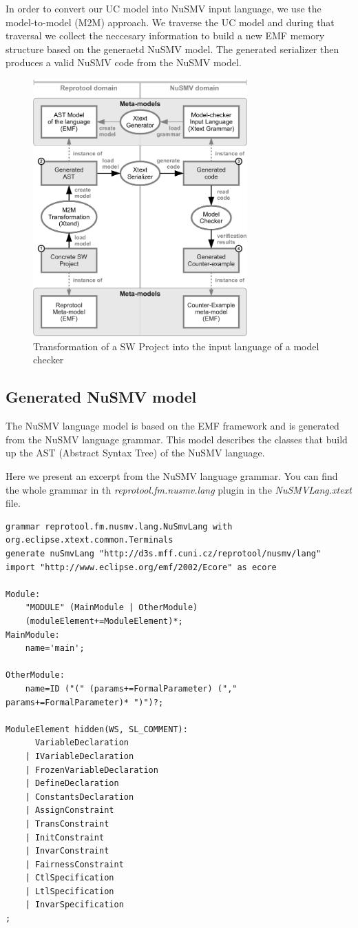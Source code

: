 In order to convert our UC model into NuSMV input language, we use the model-to-model (M2M) approach.
We traverse the UC model and during that traversal we collect the neccesary information to build a new EMF memory structure based on the generaetd NuSMV model.
The generated serializer then produces a valid NuSMV code from the NuSMV model.

\begin{figure}[ht]
  \centering
  \includegraphics[height=280pt]{images/XtextWorkflow}
  \caption{Transformation of a SW Project into the input language of a model checker}
  \label{fig:XtextWorkflow}
\end{figure}
\pagebreak

\subsection{Generated NuSMV model}

The NuSMV language model is based on the EMF framework and is generated from the NuSMV language grammar.
This model describes the classes that build up the AST (Abstract Syntax Tree) of the NuSMV language.

Here we present an excerpt from the NuSMV language grammar. You can find the whole grammar in th
\emph{reprotool.fm.nusmv.lang} plugin in the \emph{NuSMVLang.xtext} file.

\begin{lstlisting}[language=XtextGrammar]
grammar reprotool.fm.nusmv.lang.NuSmvLang with org.eclipse.xtext.common.Terminals
generate nuSmvLang "http://d3s.mff.cuni.cz/reprotool/nusmv/lang"
import "http://www.eclipse.org/emf/2002/Ecore" as ecore

Module:
	"MODULE" (MainModule | OtherModule)
	(moduleElement+=ModuleElement)*;
MainModule:
	name='main';

OtherModule:
	name=ID ("(" (params+=FormalParameter) ("," params+=FormalParameter)* ")")?;

ModuleElement hidden(WS, SL_COMMENT):
	  VariableDeclaration
	| IVariableDeclaration
	| FrozenVariableDeclaration
	| DefineDeclaration
	| ConstantsDeclaration
	| AssignConstraint
	| TransConstraint
	| InitConstraint
	| InvarConstraint
	| FairnessConstraint
	| CtlSpecification
	| LtlSpecification
	| InvarSpecification
;
\end{lstlisting}

